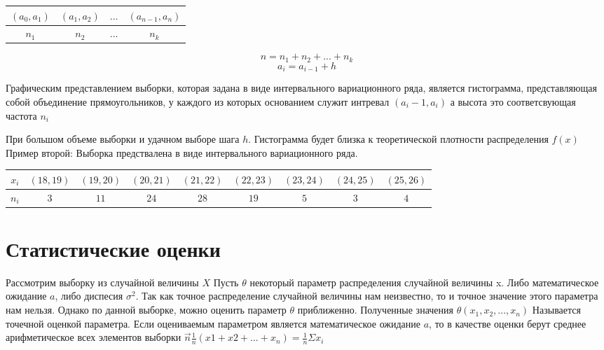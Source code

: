 \documentclass[a4paper]{article}
\begin{document}
\begin{table}[H]
    \centering
    \begin{tabular}{|c|c|c|c|}
\hline
$(a_0, a_1)$ & $(a_1, a_2)$ & $...$ & $(a_{n-1}, a_{n})$\\
\hline
$n_1$ & $n_2$ & $...$ & $n_k$ \\
\hline
\end{tabular}
\end{table}

$$n = n_1 + n_2 + ... + n_k$$
$$a_i = a_{i-1} + h$$

Графическим представлением выборки, которая задана в виде интервального вариационного ряда, является гистограмма, представляющая собой объединение прямоугольников, у каждого из которых основанием служит интревал $(a_i-1, a_i)$
а высота это соответсвующая частота $n_i$
    
При большом объеме выборки и удачном выборе шага $h$. Гистограмма будет близка к теоретической плотности распределения $f(x)$
Пример второй:
Выборка предствалена в виде интервального вариационного ряда.
\begin{table}[H]
    \centering
    \begin{tabular}{|c|c|c|c|c|c|c|c|c|}
        \hline
        $x_i$ & $(18, 19)$ & $(19, 20)$ & $(20, 21)$ & $(21, 22)$ & $(22, 23)$ & $(23, 24)$ & $(24, 25)$ & $(25, 26)$\\
        \hline
        $n_i$ & $3$ & $11$ & $24$ & $28$ & $19$ & $5$ & $3$ & $4$\\
        \hline
    \end{tabular}
\end{table}

\section{Статистические оценки}

Рассмотрим выборку из случайной величины $X$
Пусть $\theta$ некоторый параметр распределения случайной величины x. Либо математическое ожидание $a$, либо диспесия $\sigma^2$. Так как точное распределение случайной величины нам неизвестно, то и точное значение этого параметра нам нельзя. Однако по данной выборке, можно оценить параметр $\theta$ приближенно. Полученные значения $\theta(x_1, x_2, ..., x_n)$
Называется точечной оценкой параметра. Если оцениваемым параметром является математическое ожидание $a$, то в качестве оценки берут среднее арифметическое всех элементов выборки 
$ \vec{n} \frac{1}{n}(x1 + x2 + ... + x_n) = \frac{1}{n}\Sigma x_i$
\end{document}
